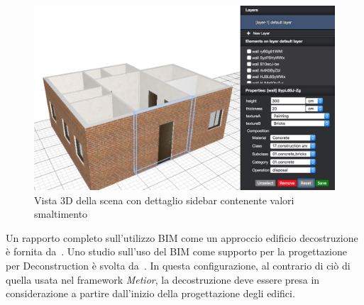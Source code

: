 \begin{figure}[htbp] %
   \centering
   \includegraphics[width=1\linewidth]{images/3d-sel}
   \caption{Vista 3D della scena con dettaglio sidebar contenente valori smaltimento}
   \label{fig:augmented}
\end{figure}

Un rapporto completo sull'utilizzo BIM come un approccio edificio decostruzione è fornita da~\cite{galic2014bim}.
Uno studio sull'uso del BIM come supporto per la progettazione per Deconstruction è svolta da~\cite{akinade2015waste}.
In questa configurazione, al contrario di ciò di quella usata nel framework \emph{Metior}, la decostruzione deve essere
presa in considerazione a partire dall'inizio della progettazione degli edifici.
\newpage



